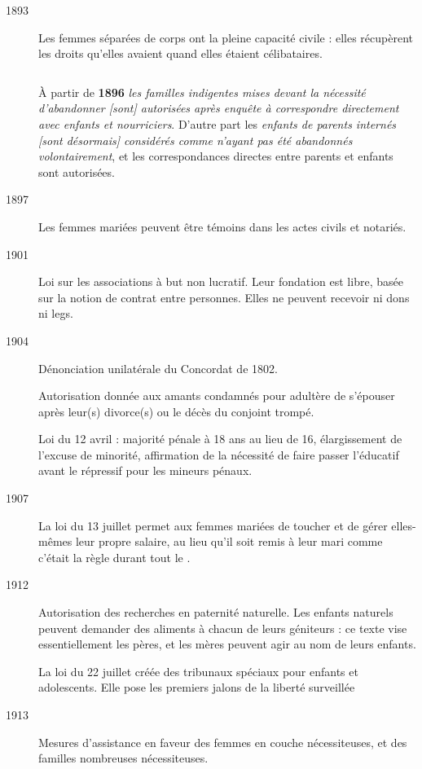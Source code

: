 \begin{description}
\item[1893] Les femmes séparées de corps ont la pleine capacité civile : elles récupèrent les droits qu'elles avaient quand elles étaient célibataires.

\item[$\!\!\!$] À partir de \textbf{1896} {\emph{les familles indigentes mises devant la nécessité d'abandonner \emph{[sont]} autorisées après enquête à correspondre directement avec enfants et nourriciers}}. D'autre part les {\emph{enfants de parents internés \emph{[sont désormais]} considérés comme n'ayant pas été abandonnés volontairement}}, et les correspondances directes entre parents et enfants sont autorisées.

\item[1897] Les femmes mariées peuvent être témoins dans les actes civils et notariés.

\item[1901] Loi sur les associations à but non lucratif. Leur fondation est libre, basée sur la notion de contrat entre personnes. Elles ne peuvent recevoir ni dons ni legs.

\item[1904] Dénonciation unilatérale du Concordat de 1802.

Autorisation donnée aux amants condamnés pour adultère de s'épouser après leur(s) divorce(s) ou le décès du conjoint trompé.

 Loi du 12 avril : majorité pénale à 18 ans au lieu de 16, élargissement de l'excuse de minorité, affirmation de la nécessité de faire passer l'éducatif avant le répressif pour les mineurs pénaux.

\item[1907] La loi du 13 juillet permet aux femmes mariées de toucher et de gérer elles-mêmes leur propre salaire, au lieu qu'il soit remis à leur mari comme c'était la règle durant tout le . 

\item[1912] Autorisation des recherches en paternité naturelle. Les enfants naturels peuvent demander des aliments à chacun de leurs géniteurs : ce texte vise essentiellement les pères, et les mères peuvent agir au nom de leurs enfants. 

La loi du 22 juillet créée des tribunaux spéciaux pour enfants et adolescents. Elle pose les premiers jalons de la liberté surveillée

\item[1913] Mesures d'assistance en faveur des femmes en couche nécessiteuses, et des familles nombreuses nécessiteuses.


\end{description}
